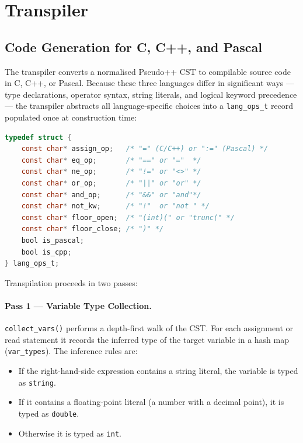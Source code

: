 \section{Transpiler}
\label{sec:transpiler}

\subsection{Code Generation for C, C++, and Pascal}
\label{subsec:codegen}

The transpiler converts a normalised Pseudo++ CST to compilable source code in
C, C++, or Pascal.  Because these three languages differ in significant ways ---
type declarations, operator syntax, string literals, and logical keyword
precedence --- the transpiler abstracts all language-specific choices into a
\texttt{lang\_ops\_t} record populated once at construction time:

\begin{lstlisting}[language=C, basicstyle=\ttfamily\small]
typedef struct {
    const char* assign_op;   /* "=" (C/C++) or ":=" (Pascal) */
    const char* eq_op;       /* "==" or "="  */
    const char* ne_op;       /* "!=" or "<>" */
    const char* or_op;       /* "||" or "or" */
    const char* and_op;      /* "&&" or "and"*/
    const char* not_kw;      /* "!"  or "not " */
    const char* floor_open;  /* "(int)(" or "trunc(" */
    const char* floor_close; /* ")" */
    bool is_pascal;
    bool is_cpp;
} lang_ops_t;
\end{lstlisting}

Transpilation proceeds in two passes:

\paragraph{Pass 1 --- Variable Type Collection.}
\texttt{collect\_vars()} performs a depth-first walk of the CST.  For each
assignment or read statement it records the inferred type of the target
variable in a hash map (\texttt{var\_types}).  The inference rules are:

\begin{itemize}
  \item If the right-hand-side expression contains a string literal, the
        variable is typed as \texttt{string}.
  \item If it contains a floating-point literal (a number with a decimal
        point), it is typed as \texttt{double}.
  \item Otherwise it is typed as \texttt{int}.
\end{itemize}

